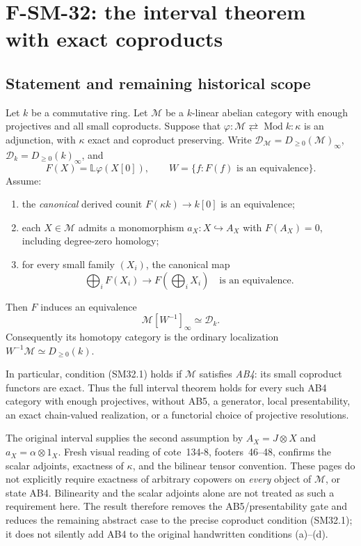 \section{F-SM-32: the interval theorem with exact coproducts}

\subsection{Statement and remaining historical scope}
Let \(k\) be a commutative ring.  Let \(\mathcal M\) be a
\(k\)-linear abelian category with enough projectives and all small
coproducts.  Suppose that
\(\varphi:\mathcal M\rightleftarrows\operatorname{Mod}k:\kappa\)
is an adjunction, with \(\kappa\) exact and coproduct preserving.
Write \(\mathcal D_{\mathcal M}=D_{\ge0}(\mathcal M)_\infty\),
\(\mathcal D_k=D_{\ge0}(k)_\infty\), and
\[
 F(X)=\mathbb L\varphi(X[0]),\qquad
 W=\{f:F(f)\text{ is an equivalence}\}.
\]
Assume:
\begin{enumerate}
\item the \emph{canonical} derived counit
\(F(\kappa k)\to k[0]\) is an equivalence;
\item each \(X\in\mathcal M\) admits a monomorphism
\(a_X:X\hookrightarrow A_X\) with \(F(A_X)=0\), including
degree-zero homology;
\item for every small family \((X_i)\), the canonical map
\[
       \bigoplus_i F(X_i)\longrightarrow
                         F\!\left(\bigoplus_iX_i\right)
                         \quad\text{is an equivalence}.       \tag{SM32.1}
\]
\end{enumerate}
Then \(F\) induces an equivalence
\[
        \mathcal M[W^{-1}]_\infty\simeq\mathcal D_k.            \tag{SM32.2}
\]
Consequently its homotopy category is the ordinary localization
\(W^{-1}\mathcal M\simeq D_{\ge0}(k)\).

In particular, condition (SM32.1) holds if \(\mathcal M\)
satisfies \emph{AB4}: its small coproduct functors are exact.
Thus the full interval theorem holds for every such AB4 category
with enough projectives, without AB5, a generator, local
presentability, an exact chain-valued realization, or a
functorial choice of projective resolutions.

The original interval supplies the second assumption by
\(A_X=J\otimes X\) and \(a_X=\alpha\otimes1_X\).
Fresh visual reading of cote~134-8, footers~46--48, confirms
the scalar adjoints, exactness of \(\kappa\), and the bilinear
tensor convention.  These pages do not explicitly require
exactness of arbitrary copowers on \emph{every} object of
\(\mathcal M\), or state AB4.  Bilinearity and the scalar
adjoints alone are not treated as such a requirement here.
The result therefore removes the AB5/presentability gate and
reduces the remaining abstract case to the precise coproduct
condition (SM32.1); it does not silently add AB4 to the original
handwritten conditions (a)--(d).

